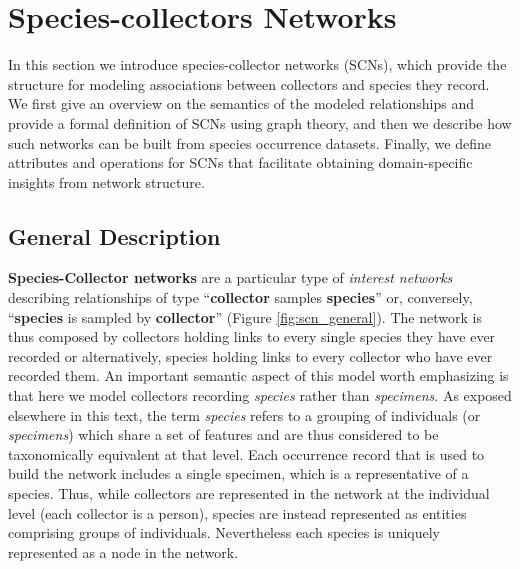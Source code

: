 {%

\section{Species-collectors Networks}

In this section we introduce species-collector networks (SCNs), which provide the structure for modeling associations between collectors and species they record. 
We first give an overview on the semantics of the modeled relationships and provide a formal definition of SCNs using graph theory, and then we describe how such networks can be built from species occurrence datasets.
Finally, we define attributes and operations for SCNs that facilitate obtaining domain-specific insights from network structure.

\subsection{General Description}
\textbf{Species-Collector networks} are a particular type of \textit{interest networks} describing relationships of type ``\textbf{collector} samples \textbf{species}'' or, conversely, ``\textbf{species} is sampled by \textbf{collector}'' (Figure \ref{fig:scn_general}). 
The network is thus composed by collectors holding links to every single species they have ever recorded or alternatively, species holding links to every collector who have ever recorded them.
An important semantic aspect of this model worth emphasizing is that here we model collectors recording \textit{species} rather than \textit{specimens}. 
As exposed elsewhere in this text, the term \textit{species} refers to a grouping of individuals (or \textit{specimens}) which share a set of features and are thus considered to be taxonomically equivalent at that level. %
Each occurrence record that is used to build the network includes a single specimen, which is a representative of a species.
Thus, while collectors are represented in the network at the individual level (each collector is a person), species are instead represented as entities comprising groups of individuals.
Nevertheless each species is uniquely represented as a node in the network.

}
